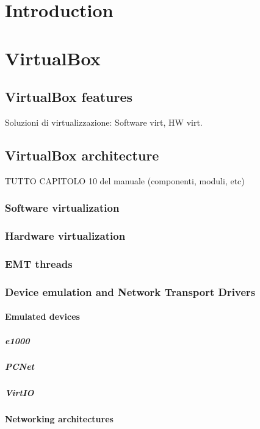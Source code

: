 \documentclass[a4paper, 12pt, titlepage]{report}
\begin{document}
\tableofcontents

\chapter{Introduction}

\chapter{VirtualBox}
\section{VirtualBox features}
Soluzioni di virtualizzazione: Software virt, HW virt.
\section{VirtualBox architecture}
TUTTO CAPITOLO 10 del manuale (componenti, moduli, etc)
\subsection{Software virtualization}
\subsection{Hardware virtualization}
\subsection{EMT threads}
\subsection{Device emulation and Network Transport Drivers}
\subsubsection{Emulated devices}
\paragraph{e1000}
\paragraph{PCNet}
\paragraph{VirtIO}
\subsubsection{Networking architectures}
\end{document}
